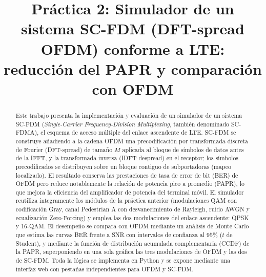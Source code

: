 \documentclass[conference,onecolumn]{IEEEtran}
\begin{document}
\title{Pr\'actica 2: Simulador de un sistema SC-FDM (DFT-spread OFDM) conforme a LTE: reducci\'on del PAPR y comparaci\'on con OFDM}

\author{
\and
{}
}

\maketitle

\begin{abstract}
Este trabajo presenta la implementaci\'on y evaluaci\'on de un simulador de un sistema SC-FDM (\textit{Single-Carrier Frequency-Division Multiplexing}, tambi\'en denominado SC-FDMA), el esquema de acceso m\'ultiple del enlace ascendente de LTE. SC-FDM se construye a\~nadiendo a la cadena OFDM una precodificaci\'on por transformada discreta de Fourier (DFT-spread) de tama\~no $M$ aplicada al bloque de s\'imbolos de datos antes de la IFFT, y la transformada inversa (IDFT-despread) en el receptor; los s\'imbolos precodificados se distribuyen sobre un bloque contiguo de subportadoras (mapeo localizado). El resultado conserva las prestaciones de tasa de error de bit (BER) de OFDM pero reduce notablemente la relaci\'on de potencia pico a promedio (PAPR), lo que mejora la eficiencia del amplificador de potencia del terminal m\'ovil. El simulador reutiliza \'integramente los m\'odulos de la pr\'actica anterior (modulaciones QAM con codificaci\'on Gray, canal Pedestrian A con desvanecimiento de Rayleigh, ruido AWGN y ecualizaci\'on Zero-Forcing) y emplea las dos modulaciones del enlace ascendente: QPSK y 16-QAM. El desempe\~no se compara con OFDM mediante un an\'alisis de Monte Carlo que estima las curvas BER frente a SNR con intervalos de confianza al $95\%$ ($t$ de Student), y mediante la funci\'on de distribuci\'on acumulada complementaria (CCDF) de la PAPR, superponiendo en una sola gr\'afica las tres modulaciones de OFDM y las dos de SC-FDM. Toda la l\'ogica se implementa en Python y se expone mediante una interfaz web con pesta\~nas independientes para OFDM y SC-FDM.
\end{abstract}
\end{document}

